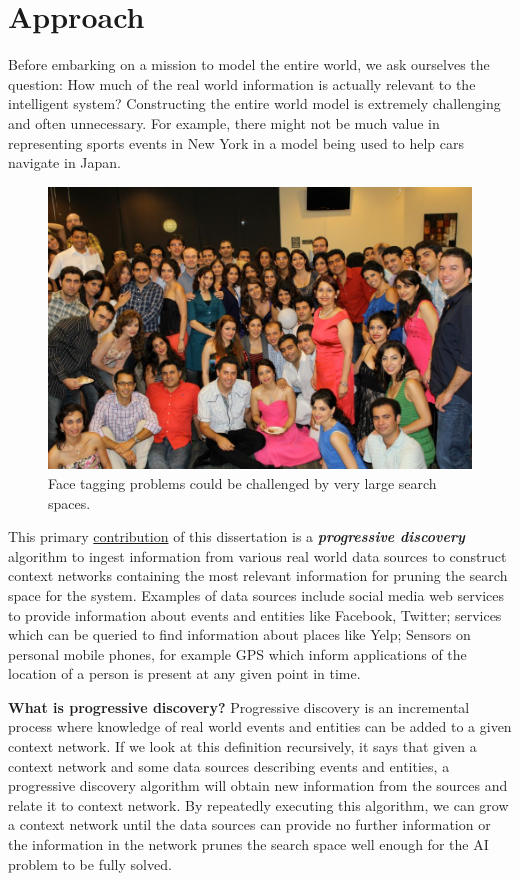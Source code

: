 \section{Approach}
Before embarking on a mission to model the entire world, we ask ourselves the question: How much of the real world information is actually relevant to the intelligent system? Constructing the entire world model is extremely challenging and often unnecessary. For example, there might not be much value in representing sports events in New York in a model being used to help cars navigate in Japan. 

\begin{figure}[t]
\centering
\includegraphics[width=\textwidth]{media/chapter1/setarehetal.png}
\caption{Face tagging problems could be challenged by very large search spaces.}
\label{fig:india-streets}
\end{figure}

This primary \uline{contribution} of this dissertation is a \textbf{\textit{progressive discovery}} algorithm to ingest information from various real world data sources to construct context networks containing the most relevant information for pruning the search space for the system. Examples of data sources include social media web services to provide information about events and entities like Facebook, Twitter; services which can be queried to find information about places like Yelp; Sensors on personal mobile phones, for example GPS which inform applications of the location of a person is present at any given point in time.

\textbf{What is progressive discovery?} Progressive discovery is an incremental process where knowledge of real world events and entities can be added to a given context network. If we look at this definition recursively, it says that given a context network and some data sources describing events and entities, a progressive discovery algorithm will obtain new information from the sources and relate it to context network. By repeatedly executing this algorithm, we can grow a context network until the data sources can provide no further information or the information in the network prunes the search space well enough for the AI problem to be fully solved.


